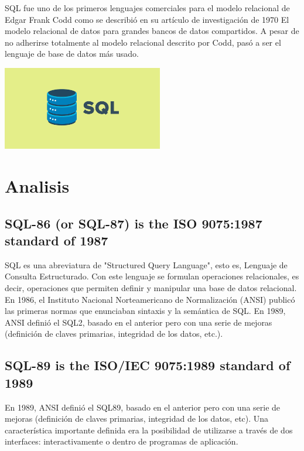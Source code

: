 \documentclass[twoside,twocolumn]{article}
\begin{document}
SQL fue uno de los primeros lenguajes comerciales para el modelo relacional de Edgar Frank Codd como se describió en su artículo de investigación de 1970 El modelo relacional de datos para grandes bancos de datos compartidos. A pesar de no adherirse totalmente al modelo relacional descrito por Codd, pasó a ser el lenguaje de base de datos más usado.

\begin{center}
	\includegraphics[width=7cm]{./Imagenes/sql} 
\end{center}


\section{Analisis}

\subsection{SQL-86 (or SQL-87) is the ISO 9075:1987 standard of 1987}
SQL es una abreviatura de "Structured Query Language", esto es, Lenguaje de Consulta Estructurado. Con este lenguaje se
formulan operaciones relacionales, es decir, operaciones que permiten definir y manipular una base de datos relacional.
En 1986, el Instituto Nacional Norteamericano de Normalización (ANSI) publicó las primeras normas que enunciaban sintaxis y la semántica de SQL. En 1989, ANSI definió el SQL2, basado en el anterior pero con una serie de mejoras (definición de claves primarias, integridad de los datos, etc.).

\subsection{SQL-89 is the ISO/IEC 9075:1989 standard of 1989}
En 1989, ANSI definió el SQL89, basado en el anterior pero con una serie de mejoras (definición de claves primarias, integridad de los datos, etc). Una característica importante definida era la posibilidad de utilizarse a través de dos interfaces: interactivamente o dentro de programas de aplicación.
\end{document}
